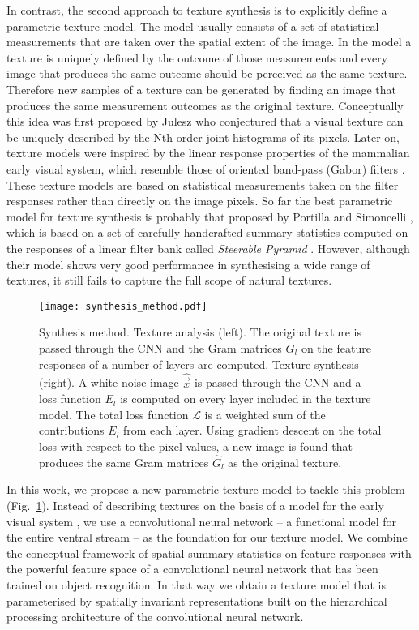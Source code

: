 \documentclass{article} %
\begin{document}
In contrast, the second approach to texture synthesis is to explicitly define a parametric texture model. The model usually consists of a set of statistical measurements that are taken over the spatial extent of the image. In the model a texture is uniquely defined by the outcome of those measurements and every image that produces the same outcome should be perceived as the same texture. Therefore new samples of a texture can be generated by finding an image that produces the same measurement outcomes as the original texture. Conceptually this idea was first proposed by Julesz \cite{julesz_visual_1962} who conjectured that a visual texture can be uniquely described by the Nth-order joint histograms of its pixels. Later on, texture models were inspired by the linear response properties of the mammalian early visual system, which resemble those of oriented band-pass (Gabor) filters \cite{heeger_pyramid-based_1995, portilla_parametric_2000}.  These texture models are based on statistical measurements taken on the filter responses rather than directly on the image pixels. So far the best parametric model for texture synthesis is probably that proposed by Portilla and Simoncelli \cite{portilla_parametric_2000}, which is based on a set of carefully handcrafted summary statistics computed on the responses of a linear filter bank called \emph{Steerable Pyramid} \cite{simoncelli_steerable_1995}. However, although their model shows very good performance in synthesising a wide range of textures, it still fails to capture the full scope of natural textures. 

\begin{figure}
\begin{center}
\texttt{[image: synthesis\_method.pdf]}%
\end{center}
\caption{\label{method}Synthesis method. Texture analysis (left). The original texture is passed through the CNN and the Gram matrices $G_l$ on the feature responses of a number of layers are computed. Texture synthesis (right). A white noise image $\hat{\vec{x}}$ is passed through the CNN and a loss function $E_l$ is computed on every layer included in the texture model. The total loss function $\mathcal{L}$ is a weighted sum of the contributions $E_l$ from each layer. Using gradient descent on the total loss with respect to the pixel values, a new image is found that produces the same Gram matrices $\hat{G}_l$ as the original texture.}
\end{figure}

In this work, we propose a new parametric texture model to tackle this problem (Fig.~\ref{method}). Instead of describing textures on the basis of a model for the early visual system \cite{portilla_parametric_2000, heeger_pyramid-based_1995}, we use a convolutional neural network -- a functional model for the entire ventral stream -- as the foundation for our texture model. We combine the conceptual framework of spatial summary statistics on feature responses with the powerful feature space of a convolutional neural network that has been trained on object recognition. In that way we obtain a texture model that is parameterised by spatially invariant representations built on the hierarchical processing architecture of the convolutional neural network. 
\end{document}
